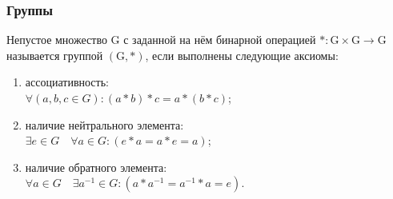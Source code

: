 \documentclass[12pt]{matmex-diploma}
\begin{document}
        \subsubsection*{Группы}
            Непустое множество G с заданной на нём бинарной операцией $*:\mathrm{G} \times \mathrm{G} \rightarrow \mathrm{G}$ называется группой $(\mathrm {G} ,*)$, если выполнены следующие аксиомы:
            \begin{enumerate}
                \item ассоциативность: \\$\forall (a,b,c\in G)\colon (a*b)*c=a*(b*c)$;
                \item наличие нейтрального элемента: \\$\exists e\in G\quad \forall a\in G\colon (e*a=a*e=a)$;
                \item наличие обратного элемента: \\$\forall a\in G\quad \exists a^{-1}\in G\colon (a*a^{-1}=a^{-1}*a=e)$.
            \end{enumerate}
            
\end{document}
